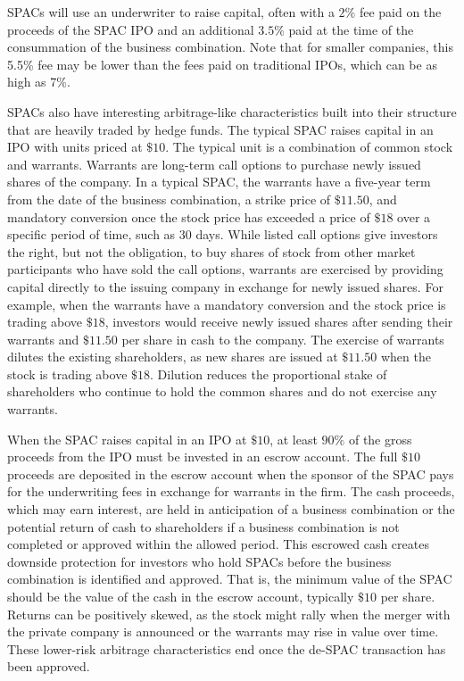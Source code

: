 \documentclass[11pt]{article}
\begin{document}
SPACs will use an underwriter to raise capital, often with a $2 \%$ fee paid on the proceeds of the SPAC IPO and an additional $3.5 \%$ paid at the time of the consummation of the business combination. Note that for smaller companies, this 5.5\% fee may be lower than the fees paid on traditional IPOs, which can be as high as 7\%.

SPACs also have interesting arbitrage-like characteristics built into their structure that are heavily traded by hedge funds. The typical SPAC raises capital in an IPO with units priced at $\$ 10$. The typical unit is a combination of common stock and warrants. Warrants are long-term call options to purchase newly issued shares of the company. In a typical SPAC, the warrants have a five-year term from the date of the business combination, a strike price of $\$ 11.50$, and mandatory conversion once the stock price has exceeded a price of $\$ 18$ over a specific period of time, such as 30 days. While listed call options give investors the right, but not the obligation, to buy shares of stock from other market participants who have sold the call options, warrants are exercised by providing capital directly to the issuing company in exchange for newly issued shares. For example, when the warrants have a mandatory conversion and the stock price is trading above $\$ 18$, investors would receive newly issued shares after sending their warrants and $\$ 11.50$ per share in cash to the company. The exercise of warrants dilutes the existing shareholders, as new shares are issued at $\$ 11.50$ when the stock is trading above $\$ 18$. Dilution reduces the proportional stake of shareholders who continue to hold the common shares and do not exercise any warrants.

When the SPAC raises capital in an IPO at $\$ 10$, at least $90 \%$ of the gross proceeds from the IPO must be invested in an escrow account. The full $\$ 10$ proceeds are deposited in the escrow account when the sponsor of the SPAC pays for the underwriting fees in exchange for warrants in the firm. The cash proceeds, which may earn interest, are held in anticipation of a business combination or the potential return of cash to shareholders if a business combination is not completed or approved within the allowed period. This escrowed cash creates downside protection for investors who hold SPACs before the business combination is identified and approved. That is, the minimum value of the SPAC should be the value of the cash in the escrow account, typically $\$ 10$ per share. Returns can be positively skewed, as the stock might rally when the merger with the private company is announced or the warrants may rise in value over time. These lower-risk arbitrage characteristics end once the de-SPAC transaction has been approved.
\end{document}

